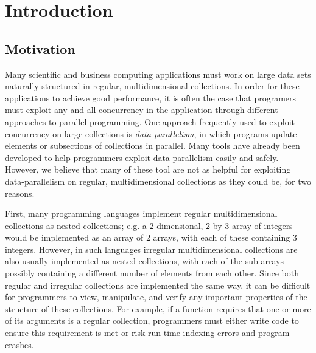 \chapter{Introduction}

\section{Motivation}
Many scientific and business computing applications must work on large data sets naturally structured in regular, multidimensional collections.
In order for these applications to achieve good performance, it is often the case that programers must exploit any and all concurrency in the application through different approaches to parallel programming.
One approach frequently used to exploit concurrency on large collections is \textit{data-parallelism}, in which programs update elements or subsections of collections in parallel.
Many tools have already been developed to help programmers exploit data-parallelism easily and safely. %
However, we believe that many of these tool are not as helpful for exploiting data-parallelism on regular, multidimensional collections as they could be, for two reasons.

First, many programming languages implement regular multidimensional collections as nested collections;
e.g. a 2-dimensional, 2 by 3 array of integers would be implemented as an array of 2 arrays, with each of these containing 3 integers.
However, in such languages irregular multidimensional collections are also usually implemented as nested collections, with each of the sub-arrays possibly containing a different number of elements from each other.
Since both regular and irregular collections are implemented the same way,
it can be difficult for programmers to view, manipulate, and verify any important properties of the structure of these collections.
For example, if a function requires that one or more of its arguments is a regular collection, programmers must either write code to ensure this requirement is met or risk run-time indexing errors and program crashes.

